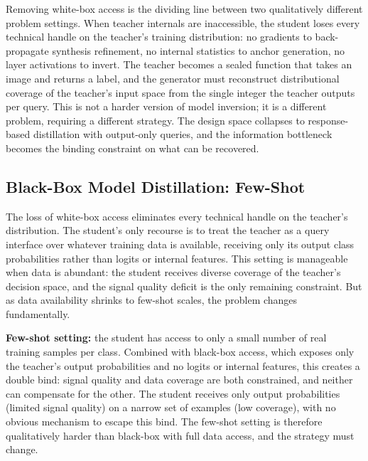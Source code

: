 \begin{foldable}
  Removing white-box access is the dividing line between two qualitatively different problem settings.
  When teacher internals are inaccessible, the student loses every technical handle on the teacher's training distribution: no gradients to back-propagate synthesis refinement, no internal statistics to anchor generation, no layer activations to invert.
  The teacher becomes a sealed function that takes an image and returns a label, and the generator must reconstruct distributional coverage of the teacher's input space from the single integer the teacher outputs per query.
  This is not a harder version of model inversion; it is a different problem, requiring a different strategy.
  The design space collapses to response-based distillation with output-only queries, and the information bottleneck becomes the binding constraint on what can be recovered.
\end{foldable}

\subsection{Black-Box Model Distillation: Few-Shot} \label{sec:24-background-kdrestricted-bbfewshot}
\begin{foldable}
  The loss of white-box access eliminates every technical handle on the teacher's distribution.
  The student's only recourse is to treat the teacher as a query interface over whatever training data is available, receiving only its output class probabilities rather than logits or internal features.
  This setting is manageable when data is abundant: the student receives diverse coverage of the teacher's decision space, and the signal quality deficit is the only remaining constraint.
  But as data availability shrinks to few-shot scales, the problem changes fundamentally.
\end{foldable}

\begin{foldable}
  \textbf{Few-shot setting:} the student has access to only a small number of real training samples per class.
  Combined with black-box access, which exposes only the teacher's output probabilities and no logits or internal features, this creates a double bind: signal quality and data coverage are both constrained, and neither can compensate for the other.
  The student receives only output probabilities (limited signal quality) on a narrow set of examples (low coverage), with no obvious mechanism to escape this bind.
  The few-shot setting is therefore qualitatively harder than black-box with full data access, and the strategy must change.
\end{foldable}

